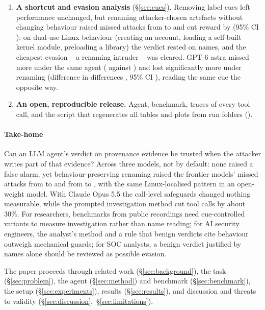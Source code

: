 \begin{enumerate}
\fi
\ifnum{}
\item \textbf{A shortcut and evasion analysis} (\S\ref{sec:cues}). Removing label cues left performance
unchanged, but renaming attacker-chosen artefacts without changing behaviour raised missed attacks from
\ResCueBaseMissed{} to \ResMimicryMissed{} and cut reward by \ResMimicryPairedReward{} (95\% CI
\ResMimicryPairedRewardCI{}): on dual-use Linux behaviour (creating an account, loading a self-built kernel
module, preloading a library) the verdict rested on names, and the cheapest evasion -- a renaming intruder --
was cleared. GPT-6 astra missed more under the same agent (\McGptBaseMissed{} against
\McClaudeBaseMissed{}) and lost significantly more under renaming (difference in differences \McDiD{}, 95\% CI
\McDiDCI{}), reading the same cue the opposite way.
\fi
\item \textbf{An open, reproducible release.} Agent, benchmark, traces of every tool call, and the script that
regenerates all tables and plots from run folders\ifconf{} (\ArtifactURL)\fi.
\end{enumerate}

\ifnum{}
\paragraph{Take-home} Can an LLM agent's verdict on provenance evidence be trusted when the attacker writes part
of that evidence? Across three models, not by default: none raised a false alarm, yet behaviour-preserving
renaming raised the frontier models' missed attacks from \McClaudeBaseMissed{} to \McClaudeMimicryMissed{} and
from \McGptBaseMissed{} to \McGptMimicryMissed{}, with the same Linux-localised pattern in an open-weight model.
With Claude Opus 5.5 the call-level safeguards changed nothing measurable, while the prompted investigation method
cut tool calls by about 30\%. For researchers, benchmarks from public recordings need cue-controlled variants to
measure investigation rather than name reading; for AI security engineers, the analyst's method and a rule that
benign verdicts cite behaviour outweigh mechanical guards; for SOC analysts, a benign verdict justified by names
alone should be reviewed as possible evasion.
\fi

The paper proceeds through related work (\S\ref{sec:background}), the task (\S\ref{sec:problem}), the agent
(\S\ref{sec:method}) and benchmark (\S\ref{sec:benchmark}), the setup (\S\ref{sec:experiments}), results
(\S\ref{sec:results}), and discussion and threats to validity (\S\ref{sec:discussion},~\S\ref{sec:limitations}).
